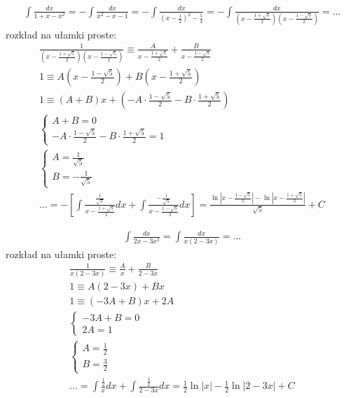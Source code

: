
\begin{gather*}\int \frac{dx}{1+x-x^2} = -\int \frac{dx}{x^2-x-1} = -\int \frac{dx}{(x-\frac{1}{2})^2-\frac{5}{4}} = -\int \frac{dx}{(x-\frac{1+\sqrt{5}}{2})(x-\frac{1-\sqrt{5}}{2})}=\ldots\end{gather*}
rozkład na ułamki proste:
\begin{gather*}\frac{1}{(x-\frac{1+\sqrt{5}}{2})(x-\frac{1-\sqrt{5}}{2})} \equiv \frac{A}{x-\frac{1+\sqrt{5}}{2}}+\frac{B}{x-\frac{1-\sqrt{5}}{2}} \\
1 \equiv A(x-\frac{1-\sqrt{5}}{2})+B(x-\frac{1+\sqrt{5}}{2}) \\
1 \equiv (A+B)x+ \left(-A \cdot \frac{1-\sqrt{5}}{2}-B \cdot \frac{1+\sqrt{5}}{2} \right) \\
\begin{cases} A+B=0 \\ -A \cdot \frac{1-\sqrt{5}}{2}-B \cdot \frac{1+\sqrt{5}}{2}=1 \end{cases} \\
\begin{cases} A=\frac{1}{\sqrt{5}} \\ B=-\frac{1}{\sqrt{5}} \end{cases} \\
\ldots = - \left[ \int \frac{\frac{1}{\sqrt{5}}}{x-\frac{1+\sqrt{5}}{2}}dx + \int \frac{-\frac{1}{\sqrt{5}}}{x-\frac{1-\sqrt{5}}{2}}dx \right] = \frac{\ln|x-\frac{1-\sqrt{5}}{2}|-\ln|x-\frac{1+\sqrt{5}}{2}|}{\sqrt{5}}+C\end{gather*}



\begin{gather*}\int \frac{dx}{2x-3x^2} = \int \frac{dx}{x(2-3x)} = \ldots\end{gather*}
rozkład na ułamki proste:
\begin{gather*}\frac{1}{x(2-3x)} \equiv \frac{A}{x}+\frac{B}{2-3x} \\
1 \equiv A(2-3x)+Bx \\
1 \equiv (-3A+B)x+2A \\
\begin{cases} -3A+B=0 \\ 2A=1 \end{cases} \\
\begin{cases} A=\frac{1}{2} \\ B=\frac{3}{2} \end{cases} \\
\ldots = \int \frac{\frac{1}{2}}{x}dx + \int \frac{\frac{3}{2}}{2-3x}dx = \frac{1}{2}\ln|x|-\frac{1}{2}\ln|2-3x|+C\end{gather*}


